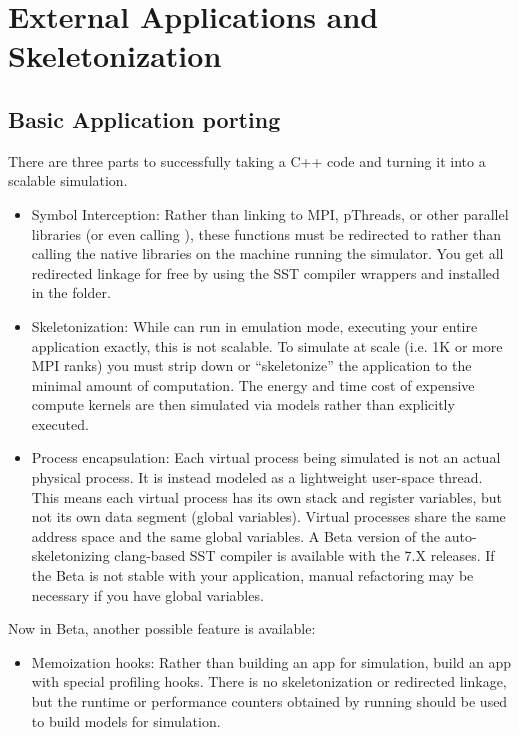 
\chapter{External Applications and Skeletonization}
\label{chap:appsAndSkeletonization}

\section{Basic Application porting}
\label{sec:skel:basic}

There are three parts to successfully taking a C++ code and turning it into a scalable simulation.
\begin{itemize}
\item Symbol Interception: Rather than linking to MPI, pThreads, or other parallel libraries (or even calling ), these functions must be redirected to \sstmacro rather than calling the native libraries on the machine running the simulator.
You get all redirected linkage for free by using
the SST compiler wrappers  and  installed in the  folder.
\item Skeletonization: While \sstmacro can run in emulation mode, executing your entire application exactly, this is not scalable.  To simulate at scale (i.e. 1K or more MPI ranks) you must strip down or ``skeletonize'' the application to the minimal amount of computation.  The energy and time cost of expensive compute kernels are then simulated via models rather than explicitly executed. 
\item Process encapsulation: Each virtual process being simulated is not an actual physical process. It is instead modeled as a lightweight user-space thread.  This means each virtual process has its own stack and register variables, but not its own data segment (global variables).
Virtual processes share the same address space and the same global variables.  A Beta version of the auto-skeletonizing clang-based SST compiler is available with the 7.X releases. If the Beta is not stable with your application, manual refactoring may be necessary if you have global variables.
\end{itemize}

Now in Beta, another possible feature is available:
\begin{itemize}
\item Memoization hooks: Rather than building an app for simulation, build an app with special profiling hooks. There is no skeletonization or redirected linkage, but the runtime or performance counters obtained by running should be used to build models for simulation.
\end{itemize}

